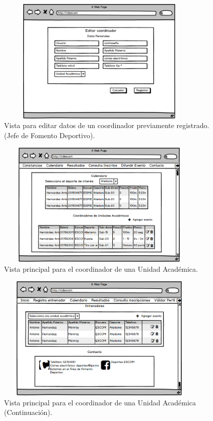 		\begin{figure} [hbt!]
			\centering
			\includegraphics[width=10cm, height=6cm]{Imagenes/Nuevos/P7_Editar_coordinador}
			\caption{Vista para editar datos de un coordinador previamente registrado. (Jefe de Fomento Deportivo).}
			\label{editarcoord}
		\end{figure}
\pagebreak

		\begin{figure} [hbt!]
			\centering
			\includegraphics[width=10cm, height=6cm]{Imagenes/Nuevos/P8_Inicio_CoordUA}
			\caption{Vista principal para el coordinador de una Unidad Académica.}
			\label{principalcoord}
		\end{figure}
	
		\begin{figure} [hbt!]
			\centering
			\includegraphics[width=10cm, height=6cm]{Imagenes/Nuevos/P9_Inicio_CoordUA1}
			\caption{Vista principal para el coordinador de una Unidad Académica (Continuación).}
			\label{principalcoord1}
		\end{figure}
	\pagebreak
		
